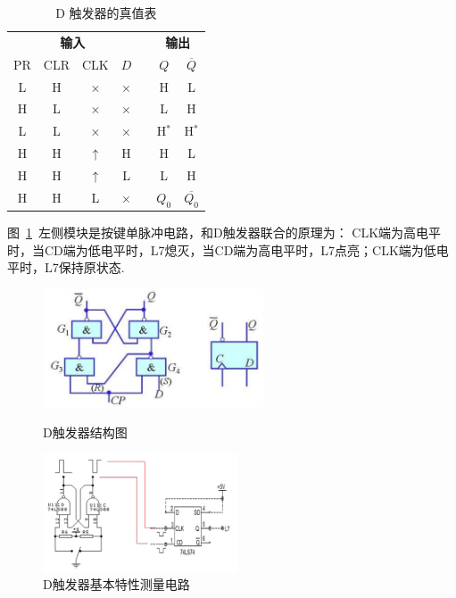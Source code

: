 \documentclass[fontset=windows,11pt]{SEU-Digital-Report}
\begin{document}
            \begin{table}[htbp]
                \centering
                \caption{D 触发器的真值表}
                \begin{tabular}{ccccccc}
                    \toprule
                    \multicolumn{4}{c}{\textbf{输入}} && \multicolumn{2}{c}{\textbf{输出}} \\
                    \cmidrule{1-4}\cmidrule{6-7}
                    PR & CLR & CLK & $D$ && $Q$ & $\overline{Q}$ \\
                    \hline\hline
                    L & H & $\times$ & $\times$ && H & L \\
                    H & L & $\times$ & $\times$ && L & H \\
                    L & L & $\times$ & $\times$ && H$^*$ & H$^*$ \\
                    H & H & $\uparrow$ & H && H & L \\
                    H & H & $\uparrow$ & L && L & H \\
                    H & H & L & $\times$ && $Q_0$ & $\overline{Q_0}$ \\
                    \bottomrule
                \end{tabular}%
                \label{tab:D_truth_table}%
            \end{table}%

            图~\ref{fig:D_test}~左侧模块是按键单脉冲电路，和D触发器联合的原理为：
            CLK端为高电平时，当CD端为低电平时，L7熄灭，当CD端为高电平时，L7点亮；CLK端为低电平时，L7保持原状态.

            \begin{figure}[htbp]
                \centering
                \begin{minipage}{0.4\linewidth}
                    \includegraphics[height=3.5cm]{fig/D_flip_flop.png}
                    \caption{D触发器结构图}
                    \label{fig:D_flip_flop}
                \end{minipage}
                \quad
                \begin{minipage}{0.4\linewidth}
                    \includegraphics[height=3.5cm]{fig/D_test.png}
                    \caption{D触发器基本特性测量电路}
                    \label{fig:D_test}
                \end{minipage}
            \end{figure}
\end{document}
